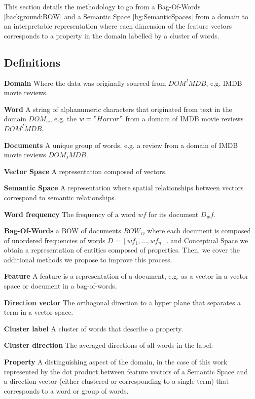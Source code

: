 This section details the methodology to go from a Bag-Of-Words \ref{background:BOW} and a Semantic Space \ref{bg:SemanticSpaces} from a domain to an interpretable representation where each dimension of the feature vectors corresponds to a property in the domain labelled by a cluster of words.

\subsection{Definitions}

\textbf{Domain} Where the data was originally sourced from $DOM^IMDB$, e.g. IMDB movie reviews.

\textbf{Word} A string of alphanumeric characters that originated from text in the domain $DOM_w$, e.g. the $w = "Horror"$ from a domain of IMDB movie reviews $DOM^IMDB$.

\textbf{Documents} A unique group of words, e.g. a review from a domain of IMDB movie reviews $DOM_IMDB$.

\textbf{Vector Space} A representation composed of vectors.

\textbf{Semantic Space} A representation where spatial relationships between vectors correspond to semantic relationships.


\textbf{Word frequency} The frequency of a word $wf$ for its document $D_wf$.


\textbf{Bag-Of-Words} a BOW of documents $BOW_D$ where each document is composed of unordered frequencies of words $D = [wf_1, ..., wf_n]$. and Conceptual Space we obtain a representation of entities composed of properties. Then, we cover the additional methods we propose to improve this process.


\textbf{Feature} A feature is a representation of a document, e.g. as a vector in a vector space or document in a bag-of-words. 

\textbf{Direction vector} The orthogonal direction to a hyper plane that separates a term in a vector space. 

\textbf{Cluster label} A cluster of words that describe a property.

\textbf{Cluster direction} The averaged directions of all words in the label.

\textbf{Property} A distinguishing aspect of the domain, in the case of this work represented by the dot product between feature vectors of a Semantic Space and a direction vector (either clustered or corresponding to a single term) that corresponds to a word or group of words.




